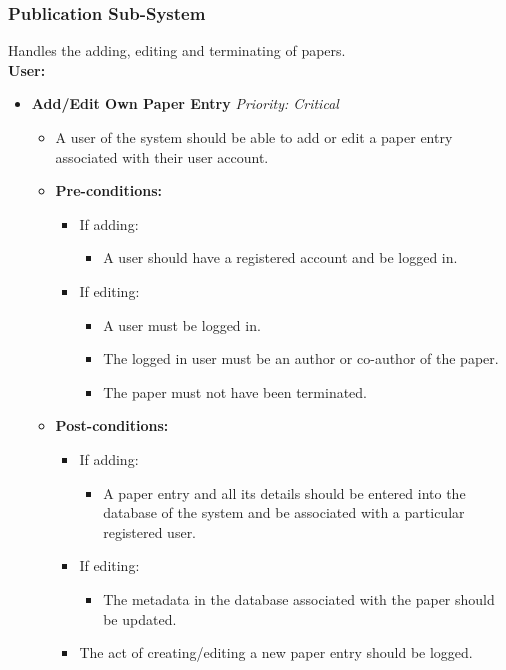 \documentclass{article}
\begin{document}
			\subsubsection{Publication Sub-System}\label{subsubsec:publication}
				Handles the adding, editing and terminating of papers.\\
				[3mm]
				\textbf{User:}
				\begin{itemize}
					\item \textbf{Add/Edit Own Paper Entry} \hfill \textit{Priority: Critical}
					\begin{itemize}
						\item A user of the system should be able to add or edit a paper entry associated with their user account.
						\item \textbf{Pre-conditions:}
						\begin{itemize}
							\item If adding:
							\begin{itemize}
								\item A user should have a registered account and be logged in.
							\end{itemize}
							\item If editing:
							\begin{itemize}
								\item A user must be logged in.
								\item The logged in user must be an author or co-author of the paper.
								\item The paper must not have been terminated.
							\end{itemize}
						\end{itemize}
						\item \textbf{Post-conditions:}
						\begin{itemize}
							\item If adding:
							\begin{itemize}
								\item A paper entry and all its details should be entered into the database of the system and be associated with a particular registered user.
							\end{itemize}
							\item If editing:
							\begin{itemize}
								\item The metadata in the database associated with the paper should be updated.
							\end{itemize}													
							\item The act of creating/editing a new paper entry should be logged.

\end{itemize}
\end{itemize}
\end{itemize}
\end{document}
